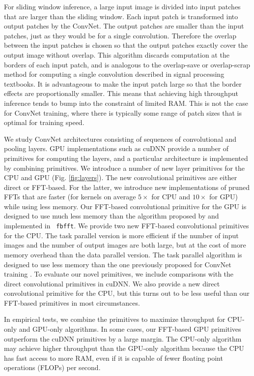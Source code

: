 \documentclass[conference]{./IEEEtran/IEEEtran}
\begin{document}
For sliding window inference, a large input image is divided into
input patches that are larger than the sliding window.  Each input
patch is transformed into output patches by the ConvNet.  The output
patches are smaller than the input patches, just as they would be for
a single convolution. Therefore the overlap between the input patches
is chosen so that the output patches exactly cover the output image
without overlap. This algorithm discards computation at the borders of
each input patch, and is analogous to the overlap-save or
overlap-scrap method for computing a single convolution described in
signal processing textbooks.  It is advantageous to make the input
patch large so that the border effects are proportionally smaller.
This means that achieving high throughput inference tends to bump into
the constraint of limited RAM.  This is not the case for ConvNet
training, where there is typically some range of patch sizes that is
optimal for training speed.

We study ConvNet architectures consisting of sequences of
convolutional and pooling layers.  GPU implementations such as cuDNN
provide a number of primitives for computing the layers, and a
particular architecture is implemented by combining primitives.  We
introduce a number of new layer primitives for the CPU and GPU
(Fig. \ref{fig:layers}). The new convolutional primitives are either
direct or FFT-based.  For the latter, we introduce new implementations
of pruned FFTs that are faster (for kernels on average $5\times$ for
CPU and $10\times$ for GPU) while using less memory.  Our FFT-based
convolutional primitive for the GPU is designed to use much less
memory than the algorithm proposed
by \cite{mathieu-iclr-14,vasilache2014fast} and implemented in {\tt
fbfft}.  We provide two new FFT-based convolutional primitives for the
CPU. The task parallel version is more efficient if the number of
input images and the number of output images are both large, but at
the cost of more memory overhead than the data parallel version.  The
task parallel algorithm is designed to use less memory than the one
previously proposed for ConvNet training \cite{zlateski2015znn}.  To
evaluate our novel primitives, we include comparisons with the direct
convolutional primitives in cuDNN.  We also provide a new direct
convolutional primitive for the CPU, but this turns out to be less
useful than our FFT-based primitives in most circumstances.

In empirical tests, we combine the primitives to maximize throughput
for CPU-only and GPU-only algorithms. In some cases, our FFT-based
GPU primitives outperform the cuDNN primitives by a large margin.  The
CPU-only algorithm may achieve higher throughput than the GPU-only
algorithm because the CPU has fast access to more RAM, even if it is
capable of fewer floating point operations (FLOPs) per second.
\end{document}
